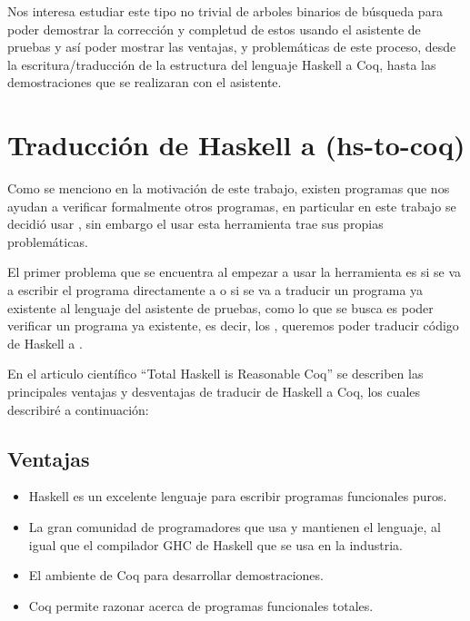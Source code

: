 Nos interesa estudiar este tipo no trivial de arboles binarios de búsqueda para poder demostrar la
correcci\'on y completud de estos usando el asistente de pruebas {\coq} y así poder mostrar las
ventajas, y problemáticas de este proceso, desde la escritura/traducción de la estructura del
lenguaje Haskell a Coq, hasta las demostraciones que se realizaran con el asistente.

\section{Traducción de Haskell a {\coq} (hs-to-coq)}
Como se menciono en la motivación de este trabajo, existen programas que nos ayudan a verificar
formalmente otros programas, en particular en este trabajo se decidió usar {\coq}, sin embargo el
usar esta herramienta trae sus propias problemáticas.

El primer problema que se encuentra al empezar a usar la herramienta es si se va a escribir el
programa directamente a {\coq} o si se va a traducir un programa ya existente al lenguaje del
asistente de pruebas, como lo que se busca es poder verificar un programa ya existente, es decir,
los {\arns}, queremos poder traducir código de Haskell a {\coq}.

En el articulo científico ``Total Haskell is Reasonable Coq''\cite{thrc} se describen las
principales ventajas y desventajas de traducir de Haskell a Coq, los cuales describiré a
continuaci\'on:

\subsection{Ventajas}
\begin{itemize}
    \item Haskell es un excelente lenguaje para escribir programas funcionales puros.
    \item La gran comunidad de programadores que usa y mantienen el lenguaje, al igual que el
    compilador GHC de Haskell que se usa en la industria.
    \item El ambiente de Coq para desarrollar demostraciones.
    \item Coq permite razonar acerca de programas funcionales totales.
\end{itemize}

